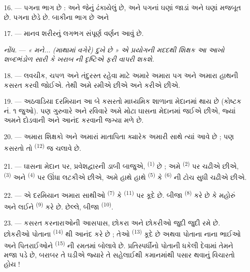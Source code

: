 16. --- પગના ભાગ છે :   અને   જેનું  
ઢંકાયેલું છે,  અને  પગનાં 
ઘણાં જાડાં અને ઘણાં મજબૂત છે. પગના છેડે  છે.
બાકીના ભાગ છે  અને 

17. --- માનવ શરીરનું લગભગ સંપૂર્ણ વર્ણન આવું છે.

\textit{નોંધ.} --- \textit{« મને... (માથામાં વગેરે) દુખે છે » એ
પ્રયોગની મદદથી શિક્ષક આ આખો શબ્દભંડોળ સારી કે ખરાબ}
\textit{ની દૃષ્ટિએ ફરી વાપરી શકશે.}

\VUsaut{5.0mm}
\VUsaut{2.4mm}
\VUsaut{3.0mm}

18. --- લવચીક, ચપળ અને તંદુરસ્ત રહેવા માટે અમારે અમારા પગ અને અમારા
હાથની કસરત કરવી જોઈએ. તેથી અમે રમીએ છીએ અને  કરીએ છીએ.

19. --- અઠવાડિયા દરમિયાન આ બે કસરતો માધ્યમિક શાળાના મેદાનમાં થાય છે
(કોષ્ટક નં. ૧ જુઓ). પણ ગુરુવારે અને રવિવારે અમે મોટા ઘાસના મેદાનમાં
જઈએ છીએ, જ્યાં અમને દોડવાની અને આનંદ કરવાની જગ્યા મળે છે.

20. --- અમારા શિક્ષકો અને અમારાં માતાપિતા ક્યારેક અમારી સાથે ત્યાં
આવે છે ; પણ કસરતો તો \textsuperscript{(12)} જ
ચલાવે છે.

21. --- ઘાસના મેદાન પર, પ્રવેશદ્વારની ડાબી બાજુએ,
\textsuperscript{(1)} છે ; અમે
\textsuperscript{(2)} પર ચઢીએ છીએ,
\textsuperscript{(3)} અને \textsuperscript{(4)} પર ઊંધા લટકીએ છીએ, અમે હાથે હાથે
\textsuperscript{(5)} કે \textsuperscript{(6)} ની ટોચ સુધી ચઢીએ છીએ.

22. --- એ દરમિયાન અમારા સાથીઓ \textsuperscript{(7)} કે \textsuperscript{(11)}
પર કૂદે છે. બીજા \textsuperscript{(8)} કરે છે કે
મહોરું અને  લઈને
\textsuperscript{(9)} કરે છે. છેલ્લે, બીજા
\textsuperscript{(10)}.

\VUsaut{4.6mm}
\VUsaut{3.0mm}

23. --- કસરત કરનારાઓની આસપાસ, છોકરા અને છોકરીઓ જુદી જુદી
 રમે છે. છોકરીઓ પોતાના \textsuperscript{(14)} થી આનંદ કરે છે ; તેઓ
\textsuperscript{(13)} કૂદે છે અથવા પોતાના નાના ભાઈઓ અને
પિતરાઈઓને \textsuperscript{(15)} ની રમતમાં બોલાવે છે.
પ્રતિસ્પર્ધીનો  પોતાની 
ધકેલી દેવામાં તેમને મજા પડે છે, બરાબર તે ઘડીએ જ્યારે તે સહેલાઈથી
કમાનમાંથી પસાર થવાનું વિચારતો હોય !

